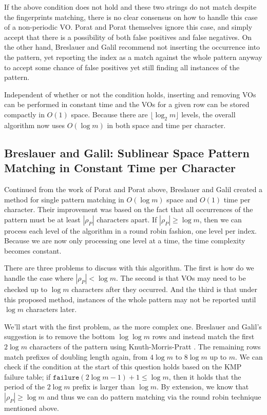 \documentclass[ %
                    author={Dominic Joseph Moylett},
                    degree={MEng},
                     title={Dictionary Matching with Fingerprints},
                  subtitle={An Empirical Analysis},
                      type={research},
                      year={2015} ]{dissertation}
\begin{document}
If the above condition does not hold and these two strings do not match despite the fingerprints matching, there is no clear consensus on how to handle this case of a non-periodic VO. Porat and Porat themselves ignore this case, and simply accept that there is a possibility of both false positives and false negatives. On the other hand, Breslauer and Galil \cite{Breslauer:2014:RSS:2660854.2635814} recommend not inserting the occurrence into the pattern, yet reporting the index as a match against the whole pattern anyway to accept some chance of false positives yet still finding all instances of the pattern.

Independent of whether or not the condition holds, inserting and removing VOs can be performed in constant time and the VOs for a given row can be stored compactly in $O(1)$ space. Because there are $\lfloor\log_2m\rfloor$ levels, the overall algorithm now uses $O(\log m)$ in both space and time per character.

\subsection{Breslauer and Galil: Sublinear Space Pattern Matching in Constant Time per Character}
\label{ssec:breslauer-galil}

Continued from the work of Porat and Porat above, Breslauer and Galil \cite{Breslauer:2014:RSS:2660854.2635814} created a method for single pattern matching in $O(\log m)$ space and $O(1)$ time per character. Their improvement was based on the fact that all occurrences of the pattern must be at least $|\rho_P|$ characters apart. If $|\rho_P| \geq \log m$, then we can process each level of the algorithm in a round robin fashion, one level per index. Because we are now only processing one level at a time, the time complexity becomes constant.

There are three problems to discuss with this algorithm. The first is how do we handle the case where $|\rho_P| < \log m$. The second is that VOs may need to be checked up to $\log m$ characters after they occurred. And the third is that under this proposed method, instances of the whole pattern may not be reported until $\log m$ characters later.

We'll start with the first problem, as the more complex one. Breslauer and Galil's suggestion is to remove the bottom $\log\log m$ rows and instead match the first $2\log m$ characters of the pattern using Knuth-Morris-Pratt \cite{kmp}. The remaining rows match prefixes of doubling length again, from $4\log m$ to $8\log m$ up to $m$. We can check if the condition at the start of this question holds based on the KMP failure table; if $\texttt{failure}(2\log m - 1) + 1 \leq \log m$, then it holds that the period of the $2\log m$ prefix is larger than $\log m$. By extension, we know that $|\rho_P| \geq \log m$ and thus we can do pattern matching via the round robin technique mentioned above.
\end{document}
